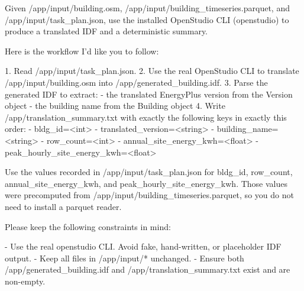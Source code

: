 \documentclass{llmxive}
\begin{document}
\begin{instructionbox}
Given \textasciigrave{}/app/input/building.osm\textasciigrave{}, \textasciigrave{}/app/input/building\_timeseries.parquet\textasciigrave{}, and \textasciigrave{}/app/input/task\_plan.json\textasciigrave{}, use the installed OpenStudio CLI (\textasciigrave{}openstudio\textasciigrave{}) to produce a translated IDF and a deterministic summary.

Here is the workflow I'd like you to follow:

1. Read \textasciigrave{}/app/input/task\_plan.json\textasciigrave{}.
2. Use the real OpenStudio CLI to translate \textasciigrave{}/app/input/building.osm\textasciigrave{} into \textasciigrave{}/app/generated\_building.idf\textasciigrave{}.
3. Parse the generated IDF to extract:
   - the translated EnergyPlus version from the \textasciigrave{}Version\textasciigrave{} object
   - the building name from the \textasciigrave{}Building\textasciigrave{} object
4. Write \textasciigrave{}/app/translation\_summary.txt\textasciigrave{} with exactly the following keys in exactly this order:
   - \textasciigrave{}bldg\_id=\textless{}int\textgreater{}\textasciigrave{}
   - \textasciigrave{}translated\_version=\textless{}string\textgreater{}\textasciigrave{}
   - \textasciigrave{}building\_name=\textless{}string\textgreater{}\textasciigrave{}
   - \textasciigrave{}row\_count=\textless{}int\textgreater{}\textasciigrave{}
   - \textasciigrave{}annual\_site\_energy\_kwh=\textless{}float\textgreater{}\textasciigrave{}
   - \textasciigrave{}peak\_hourly\_site\_energy\_kwh=\textless{}float\textgreater{}\textasciigrave{}

Use the values recorded in \textasciigrave{}/app/input/task\_plan.json\textasciigrave{} for \textasciigrave{}bldg\_id\textasciigrave{}, \textasciigrave{}row\_count\textasciigrave{}, \textasciigrave{}annual\_site\_energy\_kwh\textasciigrave{}, and \textasciigrave{}peak\_hourly\_site\_energy\_kwh\textasciigrave{}. Those values were precomputed from \textasciigrave{}/app/input/building\_timeseries.parquet\textasciigrave{}, so you do not need to install a parquet reader.

Please keep the following constraints in mind:

- Use the real \textasciigrave{}openstudio\textasciigrave{} CLI. Avoid fake, hand-written, or placeholder IDF output.
- Keep all files in \textasciigrave{}/app/input/*\textasciigrave{} unchanged.
- Ensure both \textasciigrave{}/app/generated\_building.idf\textasciigrave{} and \textasciigrave{}/app/translation\_summary.txt\textasciigrave{} exist and are non-empty.
\end{instructionbox}
\end{document}
